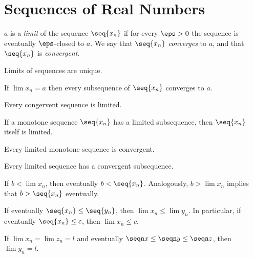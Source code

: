 \setcounter{chapter}{2}
\chapter{Sequences of Real Numbers}

\begin{definition}
	$a$ is a \emph{limit} of the sequence $\seq {x_n}$ if for every $\eps > 0$ the sequence is eventually $\eps$-closed to $a$.
	We say that $\seq{x_n}$ \emph{converges} to $a$, and that $\seq{x_n}$ is \emph{convergent}.
\end{definition}

\begin{theorem}
	Limits of sequences are unique.
\end{theorem}

\begin{theorem}
	If $\lim x_n = a$ then every subsequence of $\seq{x_n}$ converges to $a$.
\end{theorem}

\begin{theorem}
	Every congervent sequence is limited.
\end{theorem}

\begin{fact}
	If a monotone sequence $\seq{x_n}$ has a limited subsequence, then $\seq{x_n}$ itself is limited.
\end{fact}

\begin{theorem}
	Every limited monotone sequence is convergent.
\end{theorem}

\begin{corollary}
	Every limited sequence has a convergent subsequence.
\end{corollary}

\begin{theorem}
	If $b < \lim x_n$, then eventually $b < \seq{x_n}$. Analogously,
	$b > \lim x_n$ implies that $b > \seq{x_n}$ eventually.
\end{theorem}

\begin{corollary}
	If eventually $\seq{x_n} \le \seq{y_n}$, then $\lim x_n \le \lim y_n$. 
	In particular, if eventually $\seq{x_n} \le c$, then $\lim x_n \le c$.
\end{corollary}

\begin{theorem}
		If $\lim x_n = \lim z_n = l$ and eventually $\seqn x \le \seqn y \le \seqn z$, then $\lim y_n = l$.
\end{theorem}

